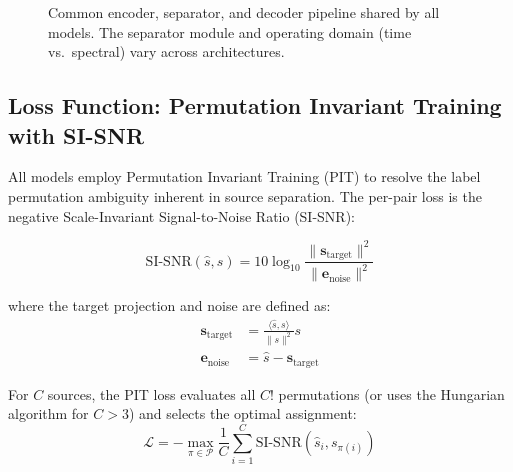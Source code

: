 \documentclass[conference]{IEEEtran}
\begin{document}
\begin{figure}[t]
\centering
{}
\caption{Common encoder, separator, and decoder pipeline shared by all models. The separator module and operating domain (time vs.\ spectral) vary across architectures.}
\label{fig:overview}
\end{figure}

\subsection{Loss Function: Permutation Invariant Training with SI-SNR}

All models employ Permutation Invariant Training (PIT) to resolve the label permutation ambiguity inherent in source separation. The per-pair loss is the negative Scale-Invariant Signal-to-Noise Ratio (SI-SNR):

\begin{equation}
\text{SI-SNR}(\hat{s}, s) = 10 \log_{10} \frac{\|\mathbf{s}_{\text{target}}\|^2}{\|\mathbf{e}_{\text{noise}}\|^2}
\label{eq:sisnr}
\end{equation}

where the target projection and noise are defined as:
\begin{align}
\mathbf{s}_{\text{target}} &= \frac{\langle \hat{s}, s \rangle}{\|s\|^2} s \\
\mathbf{e}_{\text{noise}} &= \hat{s} - \mathbf{s}_{\text{target}}
\end{align}

For $C$ sources, the PIT loss evaluates all $C!$ permutations (or uses the Hungarian algorithm for $C > 3$) and selects the optimal assignment:
\begin{equation}
\mathcal{L} = -\max_{\pi \in \mathcal{P}} \frac{1}{C} \sum_{i=1}^{C} \text{SI-SNR}(\hat{s}_i, s_{\pi(i)})
\end{equation}
\end{document}
